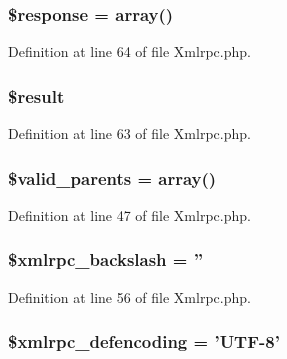 \subsubsection[{\$response}]{\setlength{\rightskip}{0pt plus 5cm}\$response = array()}\label{class_c_i___xmlrpc_af4b6fb1bbc77ccc05f10da3b16935b99}


Definition at line 64 of file Xmlrpc.\-php.

\subsubsection[{\$result}]{\setlength{\rightskip}{0pt plus 5cm}\$result}\label{class_c_i___xmlrpc_a112ef069ddc0454086e3d1e6d8d55d07}


Definition at line 63 of file Xmlrpc.\-php.

\subsubsection[{\$valid\-\_\-parents}]{\setlength{\rightskip}{0pt plus 5cm}\$valid\-\_\-parents = array()}\label{class_c_i___xmlrpc_a801945a338a9dee5f723c00cb71657b7}


Definition at line 47 of file Xmlrpc.\-php.

\subsubsection[{\$xmlrpc\-\_\-backslash}]{\setlength{\rightskip}{0pt plus 5cm}\$xmlrpc\-\_\-backslash = ''}\label{class_c_i___xmlrpc_a2bfcef776e3e3cd8f7700e375c6ccaec}


Definition at line 56 of file Xmlrpc.\-php.

\subsubsection[{\$xmlrpc\-\_\-defencoding}]{\setlength{\rightskip}{0pt plus 5cm}\$xmlrpc\-\_\-defencoding = 'U\-T\-F-\/8'}\label{class_c_i___xmlrpc_a7a31af447cebbb81b1f3c5581cd90d5a}


